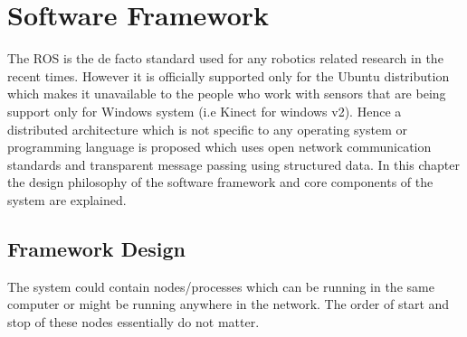 
\chapter{Software Framework} %

\label{Chapter4} %

		The ROS\cite{quigley2009ros} is the de facto standard used for any robotics related research in the recent times. However it is officially supported only for the Ubuntu distribution which makes it unavailable to the people who work with sensors that are being support only for Windows system (i.e Kinect for windows v2). Hence a distributed architecture which is not specific to any operating system or programming language is proposed which uses open network communication standards and transparent message passing using structured data. In this chapter the design philosophy of the software framework and core components of the system are explained.
		
\section{Framework Design}		
	The system could contain nodes/processes which can be running in the same computer or might be running anywhere in the network. The order of start and stop of these nodes essentially do not matter.
